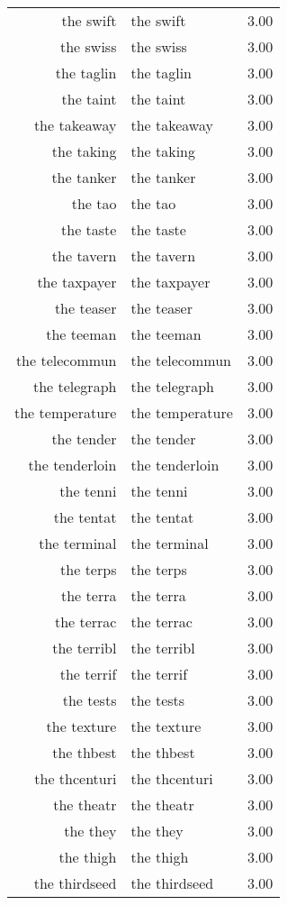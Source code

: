 \begin{table}[ht]
\begin{tabular}{rlr}
  the swift & the swift & 3.00 \\ 
  the swiss & the swiss & 3.00 \\ 
  the taglin & the taglin & 3.00 \\ 
  the taint & the taint & 3.00 \\ 
  the takeaway & the takeaway & 3.00 \\ 
  the taking & the taking & 3.00 \\ 
  the tanker & the tanker & 3.00 \\ 
  the tao & the tao & 3.00 \\ 
  the taste & the taste & 3.00 \\ 
  the tavern & the tavern & 3.00 \\ 
  the taxpayer & the taxpayer & 3.00 \\ 
  the teaser & the teaser & 3.00 \\ 
  the teeman & the teeman & 3.00 \\ 
  the telecommun & the telecommun & 3.00 \\ 
  the telegraph & the telegraph & 3.00 \\ 
  the temperature & the temperature & 3.00 \\ 
  the tender & the tender & 3.00 \\ 
  the tenderloin & the tenderloin & 3.00 \\ 
  the tenni & the tenni & 3.00 \\ 
  the tentat & the tentat & 3.00 \\ 
  the terminal & the terminal & 3.00 \\ 
  the terps & the terps & 3.00 \\ 
  the terra & the terra & 3.00 \\ 
  the terrac & the terrac & 3.00 \\ 
  the terribl & the terribl & 3.00 \\ 
  the terrif & the terrif & 3.00 \\ 
  the tests & the tests & 3.00 \\ 
  the texture & the texture & 3.00 \\ 
  the thbest & the thbest & 3.00 \\ 
  the thcenturi & the thcenturi & 3.00 \\ 
  the theatr & the theatr & 3.00 \\ 
  the they & the they & 3.00 \\ 
  the thigh & the thigh & 3.00 \\ 
  the thirdseed & the thirdseed & 3.00 \\ 

\end{tabular}
\end{table}
